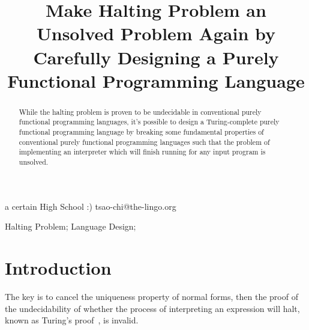 \documentclass[10pt,preprint,numbers]{sigplanconf}
\begin{document}

\title{Make Halting Problem an Unsolved Problem Again by Carefully Designing a Purely Functional Programming Language}

           {a certain High School :)}
           {tsao-chi@the-lingo.org}

\maketitle

\begin{abstract}

While the halting problem is proven to be undecidable in conventional purely functional programming languages,
it's possible to design a Turing-complete purely functional programming language
by breaking some fundamental properties of conventional purely functional programming languages
such that the problem of implementing an interpreter which will finish running for any input program is unsolved.
\end{abstract}

{\footnotesize
{}
\keywords
Halting Problem; Language Design;
}


\section{Introduction}

The key is to cancel the uniqueness property of normal forms, then the proof of the undecidability of whether the process of interpreting an expression will halt, known as Turing's proof~\citep{turing_paper}, is invalid.
\end{document}
